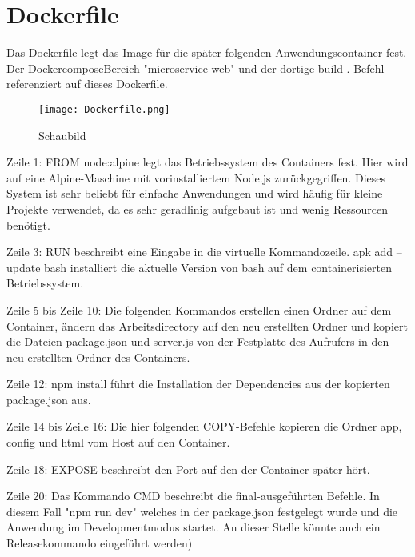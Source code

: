 
\chapter{Dockerfile}
\label{ch:Dockerfile}
Das Dockerfile legt das Image für die später folgenden Anwendungscontainer fest. Der DockercomposeBereich "microservice-web" und der dortige build . Befehl referenziert auf dieses Dockerfile.

\begin{wrapfigure}{r}{0\textwidth}
\centering
\texttt{[image: Dockerfile.png]}
\vspace{3pt}
\caption{Schaubild\footnotemark}
\label{fig:blueant}
\end{wrapfigure}

Zeile 1: FROM node:alpine legt das Betriebssystem des Containers fest. Hier wird auf eine Alpine-Maschine mit vorinstalliertem Node.js zurückgegriffen. Dieses System ist sehr beliebt für einfache Anwendungen und wird häufig für kleine Projekte verwendet, da es sehr geradlinig aufgebaut ist und wenig Ressourcen benötigt.

Zeile 3: RUN beschreibt eine Eingabe in die virtuelle Kommandozeile. apk add --update bash installiert die aktuelle Version von bash auf dem containerisierten Betriebssystem.

Zeile 5 bis Zeile 10: Die folgenden Kommandos erstellen einen Ordner auf dem Container, ändern das Arbeitsdirectory auf den neu erstellten Ordner und kopiert die Dateien package.json und server.js von der Festplatte des Aufrufers in den neu erstellten Ordner des Containers.

Zeile 12: npm install führt die Installation der Dependencies aus der kopierten package.json aus.

Zeile 14 bis Zeile 16: Die hier folgenden COPY-Befehle kopieren die Ordner app, config und html vom Host auf den Container.

Zeile 18: EXPOSE beschreibt den Port auf den der Container später hört.

Zeile 20: Das Kommando CMD beschreibt die final-ausgeführten Befehle. In diesem Fall "npm run dev" welches in der package.json festgelegt wurde und die Anwendung im Developmentmodus startet. An dieser Stelle könnte auch ein Releasekommando eingeführt werden)